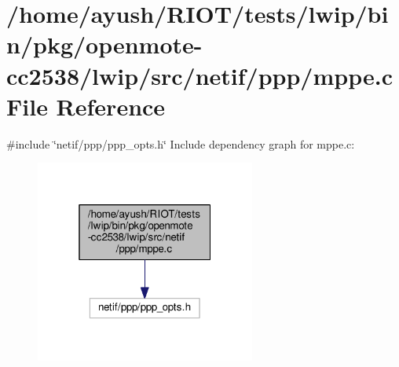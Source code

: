 \hypertarget{openmote-cc2538_2lwip_2src_2netif_2ppp_2mppe_8c}{}\section{/home/ayush/\+R\+I\+O\+T/tests/lwip/bin/pkg/openmote-\/cc2538/lwip/src/netif/ppp/mppe.c File Reference}
\label{openmote-cc2538_2lwip_2src_2netif_2ppp_2mppe_8c}
{\ttfamily \#include \char`\"{}netif/ppp/ppp\+\_\+opts.\+h\char`\"{}}\newline
Include dependency graph for mppe.\+c\+:
\nopagebreak
\begin{figure}[H]
\begin{center}
\leavevmode
\includegraphics[width=205pt]{openmote-cc2538_2lwip_2src_2netif_2ppp_2mppe_8c__incl}
\end{center}
\end{figure}
